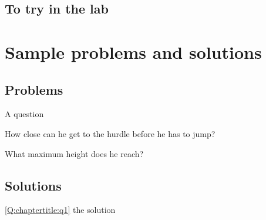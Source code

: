 \subsection{To try in the lab}

\newpage
\section{Sample problems and solutions}
\subsection{Problems}
\begin{problemParts}{A question\label{Q:chaptertitle:q1}}
\item How close can he get to the hurdle before he has to jump?
\item What maximum height does he reach?
\end{problemParts}

\newpage
\subsection{Solutions}
\begin{solution}{\ref{Q:chaptertitle:q1}}
{
the solution
}
\end{solution}

